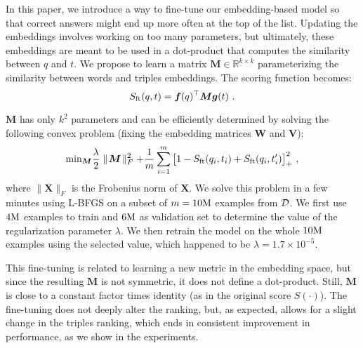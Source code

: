 \documentclass[runningheads,a4paper]{llncs}
\renewcommand{\Re}{\mathbb{R}}
\newcommand{\bbW}{\boldsymbol{W}}
\newcommand{\bbX}{\boldsymbol{X}}
\newcommand{\bbM}{\boldsymbol{M}}
\newcommand{\bbV}{\boldsymbol{V}}
\newcommand{\bbg}{\boldsymbol{g}}
\newcommand{\bbf}{\boldsymbol{f}}
\newcommand{\norm}[1]{\parallel\! #1\! \parallel}
\newcommand{\Sft}[2]{S_{{\rm ft}}(#1,#2)}
\begin{document}
In this paper, we introduce a way to fine-tune our embedding-based model so that correct answers might end up more often at the top of the list.
Updating the embeddings involves working on too many parameters, but ultimately, these embeddings are meant to be used in a dot-product that computes the similarity between $q$ and $t$.
We propose to learn a matrix $\bbM\in\Re^{k\times k}$ parameterizing the similarity between words and triples embeddings.
The scoring function becomes:
$$
\Sft{q}{t} = \bbf(q)^\top \bbM \bbg(t)~.
$$

$\bbM$ has only $k^2$ parameters and can be efficiently determined by solving the following convex problem (fixing the embedding matrices $\bbW$ and $\bbV$):
\begin{equation*}\label{eq:m}
 {\rm min}_{\bbM}  \frac{\lambda}{2}\norm{\bbM}^2_{F} + \frac{1}{m}\sum_{i=1}^m\big[1 - \Sft{q_i}{t_i} + \Sft{q_i}{t_i'}\big]^2_+~,
\end{equation*}
where $\norm{\bbX}_{F}$ is the Frobenius norm of $\bbX$.
We solve this problem in a few minutes using L-BFGS on a subset of $m=10{\rm M}$ examples from ${\cal D}$. We first use $4{\rm M}$ examples to train and $6{\rm M}$ as validation set to determine the value of the regularization parameter $\lambda$. We then retrain the model on the whole $10{\rm M}$ examples using the selected value, which happened to be $\lambda=1.7\times10^{-5}$.

This fine-tuning is related to learning a new metric in the embedding space, but since the resulting $\bbM$ is not symmetric, it does not define a dot-product.
Still, $\bbM$ is close to a constant factor times identity (as in the original score $S(\cdot)$).
The fine-tuning does not deeply alter the ranking, but, as expected, allows for a slight change in the triples ranking, 
which ends in consistent improvement in performance, as we show in the experiments.
\end{document}
